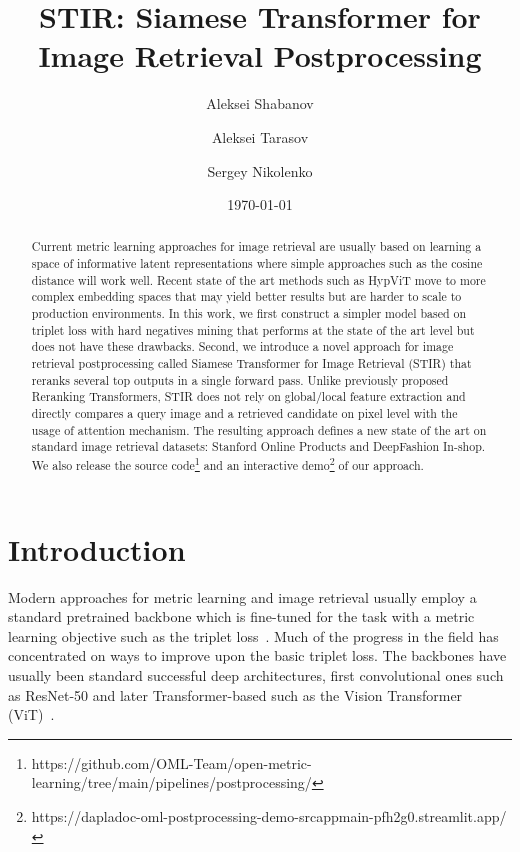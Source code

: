 \documentclass{article}
\begin{document}
\title{STIR: Siamese Transformer for Image Retrieval Postprocessing}
\date{\today}

\author[1]{Aleksei Shabanov}
\author[2]{Aleksei Tarasov}
\author[1]{Sergey Nikolenko}





\maketitle

\begin{abstract}
Current metric learning approaches for image retrieval are usually based on learning a space of informative latent representations where simple approaches such as the cosine distance will work well. Recent state of the art methods such as HypViT move to more complex embedding spaces that may yield better results but are harder to scale to production environments. In this work, we first construct a simpler model based on triplet loss with hard negatives mining that performs at the state of the art level but does not have these drawbacks. Second, we introduce a novel approach for image retrieval postprocessing called Siamese Transformer for Image Retrieval (STIR) that reranks several top outputs in a single forward pass. Unlike previously proposed Reranking Transformers, STIR does not rely on global/local feature extraction and directly compares a query image and a retrieved candidate on pixel level with the usage of attention mechanism. The resulting approach defines a new state of the art on standard image retrieval datasets: Stanford Online Products and DeepFashion In-shop. We also release the source code\footnote{
https://github.com/OML-Team/open-metric-learning/tree/main/pipelines/postprocessing/
} and an interactive demo\footnote{https://dapladoc-oml-postprocessing-demo-srcappmain-pfh2g0.streamlit.app/} of our approach.
\end{abstract}

\section{Introduction}

Modern approaches for metric learning and image retrieval usually employ a standard pretrained backbone which is fine-tuned for the task with a metric learning objective such as the triplet loss~\cite{10.5555/1756006.1756042}. Much of the progress in the field has concentrated on ways to improve upon the basic triplet loss. The backbones have usually been standard successful deep architectures, first convolutional ones such as ResNet-50 and later Transformer-based such as the Vision Transformer (ViT)~\cite{DBLP:journals/corr/abs-2010-11929}.
\end{document}
